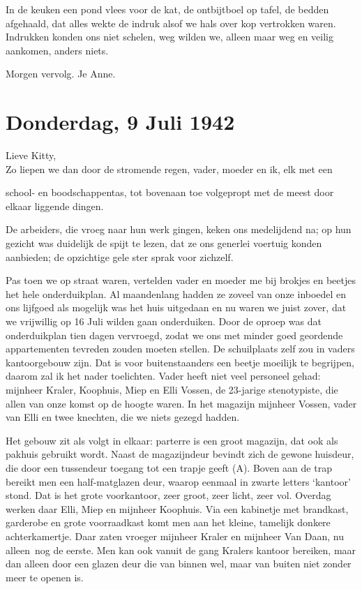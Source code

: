 \documentclass{book}
\begin{document}
In de keuken een pond vlees voor de kat, de ontbijtboel op tafel, de
bedden afgehaald, dat alles wekte de indruk alsof we hals over kop
vertrokken waren. Indrukken konden ons niet schelen, weg wilden we,
alleen maar weg en veilig aankomen, anders niets.

Morgen vervolg. Je Anne.

\chapter{Donderdag, 9 Juli 1942}

Lieve Kitty,\\Zo liepen we dan door de stromende regen, vader, moeder en
ik, elk met een

school- en boodschappentas, tot bovenaan toe volgepropt met de meest
door elkaar liggende dingen.

De arbeiders, die vroeg naar hun werk gingen, keken ons medelijdend na;
op hun gezicht was duidelijk de spijt te lezen, dat ze ons generlei
voertuig konden aanbieden; de opzichtige gele ster sprak voor zichzelf.

Pas toen we op straat waren, vertelden vader en moeder me bij brokjes en
beetjes het hele onderduikplan. Al maandenlang hadden ze zoveel van onze
inboedel en ons lijfgoed als mogelijk was het huis uitgedaan en nu waren
we juist zover, dat we vrijwillig op 16 Juli wilden gaan onderduiken.
Door de oproep was dat onderduikplan tien dagen vervroegd, zodat we ons
met minder goed geordende appartementen tevreden zouden moeten stellen.
De schuilplaats zelf zou in vaders kantoorgebouw zijn. Dat is voor
buitenstaanders een beetje moeilijk te begrijpen, daarom zal ik het
nader toelichten. Vader heeft niet veel personeel gehad: mijnheer
Kraler, Koophuis, Miep en Elli Vossen, de 23-jarige stenotypiste, die
allen van onze komst op de hoogte waren. In het magazijn mijnheer
Vossen, vader van Elli en twee knechten, die we niets gezegd hadden.

Het gebouw zit als volgt in elkaar: parterre is een groot magazijn, dat
ook als pakhuis gebruikt wordt. Naast de magazijndeur bevindt zich de
gewone huisdeur, die door een tussendeur toegang tot een trapje geeft
(A). Boven aan de trap bereikt men een half-matglazen deur, waarop
eenmaal in zwarte letters `kantoor' stond. Dat is het grote voorkantoor,
zeer groot, zeer licht, zeer vol. Overdag werken daar Elli, Miep en
mijnheer Koophuis. Via een kabinetje met brandkast, garderobe en grote
voorraadkast komt men aan het kleine, tamelijk donkere achterkamertje.
Daar zaten vroeger mijnheer Kraler en mijnheer Van Daan, nu alleen~nog
de eerste. Men kan ook vanuit de gang Kralers kantoor bereiken, maar dan
alleen door een glazen deur die van binnen wel, maar van buiten niet
zonder meer te openen is.
\end{document}
